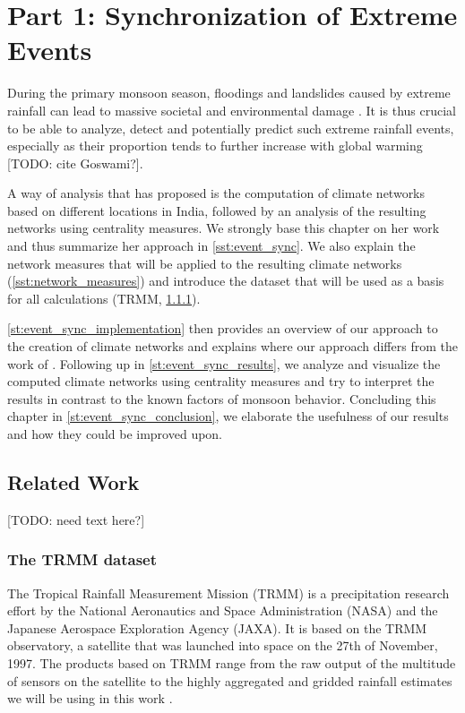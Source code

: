 \chapter{Part 1: Synchronization of Extreme Events}
\label{c:event_sync}
During the primary monsoon season, floodings and landslides caused by extreme rainfall can lead to massive societal and environmental damage \citep{Stolbova.2015}. It is thus crucial to be able to analyze, detect and potentially predict such extreme rainfall events, especially as their proportion tends to further increase with global warming \citep{Stolbova.2015} [TODO: cite Goswami?].

A way of analysis that \citet{Stolbova.2015} has proposed is the computation of climate networks based on different locations in India, followed by an analysis of the resulting networks using centrality measures. We strongly base this chapter on her work and thus summarize her approach in \cref{sst:event_sync}. We also explain the network measures that will be applied to the resulting climate networks (\cref{sst:network_measures}) and introduce the dataset that will be used as a basis for all calculations (TRMM, \cref{sst:trmm_dataset}).

\cref{st:event_sync_implementation} then provides an overview of our approach to the creation of climate networks and explains where our approach differs from the work of \citep{Stolbova.2015}. Following up in \cref{st:event_sync_results}, we analyze and visualize the computed climate networks using centrality measures and try to interpret the results in contrast to the known factors of monsoon behavior. Concluding this chapter in \cref{st:event_sync_conclusion}, we elaborate the usefulness of our results and how they could be improved upon.

\section{Related Work}
[TODO: need text here?]

\subsection{The TRMM dataset}
\label{sst:trmm_dataset}
The Tropical Rainfall Measurement Mission (TRMM) is a precipitation research effort by the National Aeronautics and Space Administration (NASA) and the Japanese Aerospace Exploration Agency (JAXA). It is based on the TRMM observatory, a satellite that was launched into space on the 27th of November, 1997. The products based on TRMM range from the raw output of the multitude of sensors on the satellite to the highly aggregated and gridded rainfall estimates we will be using in this work \citep{GoddardEarthScienceDataInformationandServicesCenter.2016}.

